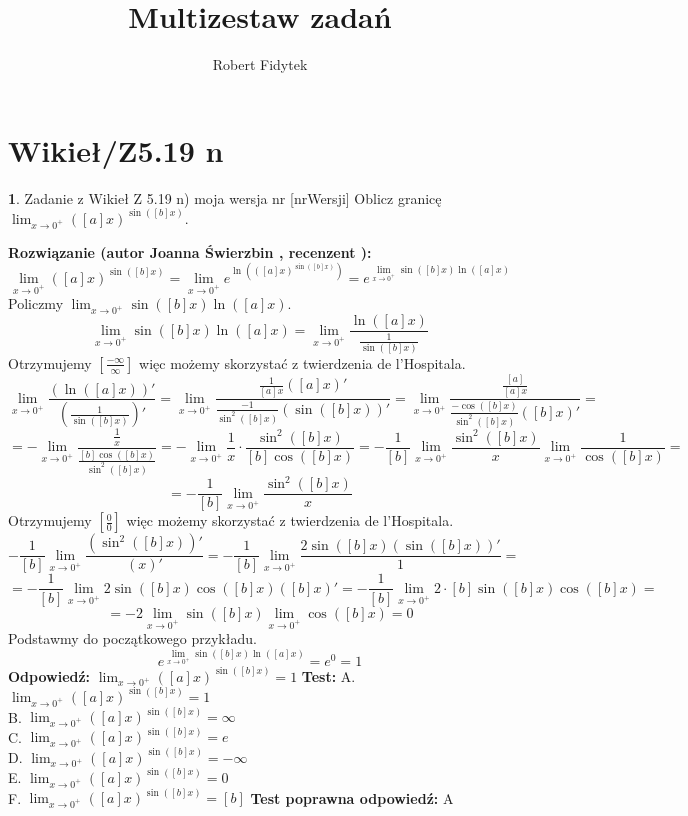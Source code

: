 \documentclass[12pt, a4paper]{article}
\title{Multizestaw zadań}
\author{Robert Fidytek}
\date{}
\theoremstyle{definition} %
\newtheorem{zad}{}
\newcommand{\kategoria}[1]{\section{#1}} %
\newcommand{\zadStart}[1]{\begin{zad}#1\newline} %
\newcommand{\zadStop}{\end{zad}}   %
\newcommand{\rozwStart}[2]{\noindent \textbf{Rozwiązanie (autor #1 , recenzent #2): }\newline} %
\newcommand{\rozwStop}{\newline}                                            %
\newcommand{\odpStart}{\noindent \textbf{Odpowiedź:}\newline}    %
\newcommand{\odpStop}{\newline}                                             %
\newcommand{\testStart}{\noindent \textbf{Test:}\newline} %
\newcommand{\testStop}{\newline} %
\newcommand{\kluczStart}{\noindent \textbf{Test poprawna odpowiedź:}\newline} %
\newcommand{\kluczStop}{\newline} %
\begin{document}
\maketitle


\kategoria{Wikieł/Z5.19 n}
\zadStart{Zadanie z Wikieł Z 5.19 n) moja wersja nr [nrWersji]}
Oblicz granicę $\lim_{x \rightarrow 0^{+}} \left( [a]x\right)^{\sin([b]x)}$.
\zadStop
\rozwStart{Joanna Świerzbin}{}
$$\lim_{x \rightarrow 0^{+}} \left( [a]x\right)^{\sin([b]x)}= \lim_{x \rightarrow 0^{+}} e^{\ln \left(\left( [a]x\right)^{\sin([b]x)} \right)}=
e^{\lim_{x \rightarrow 0^{+}}  {\sin([b]x)} \ln \left( [a]x\right)}$$
Policzmy ${\lim_{x \rightarrow 0^{+}}  {\sin([b]x)} \ln \left( [a]x\right)}$.
$${\lim_{x \rightarrow 0^{+}}  {\sin([b]x)} \ln \left( [a]x\right)} = \lim_{x \rightarrow 0^{+}} \frac{\ln \left( [a]x\right)}{\frac{1}{\sin([b]x)}}$$
Otrzymujemy $ \left[ \frac{-\infty}{\infty} \right] $ więc możemy skorzystać z twierdzenia de l'Hospitala.
$$\lim_{x \rightarrow 0^{+}} \frac{\left( \ln \left( [a]x\right) \right)'}{\left(\frac{1}{\sin([b]x)}\right)'} =
\lim_{x \rightarrow 0^{+}} \frac{\frac{1}{[a]x}([a]x)'}{\frac{-1}{\sin^2([b]x)}\left( \sin([b]x) \right)'} =
\lim_{x \rightarrow 0^{+}} \frac{\frac{[a]}{[a]x}}{\frac{-\cos([b]x)}{\sin^2([b]x)}\left( [b]x \right)'} =$$
$$=-\lim_{x \rightarrow 0^{+}} \frac{\frac{1}{x}}{\frac{[b]\cos([b]x)}{\sin^2([b]x)}} =
-\lim_{x \rightarrow 0^{+}} \frac{1}{x} \cdot \frac{\sin^2([b]x)}{[b]\cos([b]x)} =
-\frac{1}{[b]} \lim_{x \rightarrow 0^{+}} \frac{\sin^2([b]x)}{x} \lim_{x \rightarrow 0^{+}} \frac{1}{\cos([b]x)} =$$
$$ = -\frac{1}{[b]} \lim_{x \rightarrow 0^{+}} \frac{\sin^2([b]x)}{x}  $$
Otrzymujemy $ \left[ \frac{0}{0} \right] $ więc możemy skorzystać z twierdzenia de l'Hospitala.
$$ -\frac{1}{[b]} \lim_{x \rightarrow 0^{+}} \frac{\left(\sin^2([b]x)\right)'}{\left(x\right)'}=
-\frac{1}{[b]} \lim_{x \rightarrow 0^{+}} \frac{2\sin([b]x)\left( \sin([b]x) \right)'}{1}=$$
$$=-\frac{1}{[b]} \lim_{x \rightarrow 0^{+}} {2\sin([b]x) \cos([b]x)([b]x)'}= -\frac{1}{[b]} \lim_{x \rightarrow 0^{+}} {2\cdot [b]\sin([b]x) \cos([b]x)}=$$
$$= -2 \lim_{x \rightarrow 0^{+}} {\sin([b]x) \lim_{x \rightarrow 0^{+}} \cos([b]x)}= 0$$
Podstawmy do początkowego przykładu.
$$e^{\lim_{x \rightarrow 0^{+}}  {\sin([b]x)} \ln \left( [a]x\right)} = e^{0} =1 $$
\rozwStop
\odpStart
$\lim_{x \rightarrow 0^{+}} \left( [a]x\right)^{\sin([b]x)} = 1$
\odpStop
\testStart
A. $\lim_{x \rightarrow 0^{+}} \left( [a]x\right)^{\sin([b]x)} = 1$\\
B. $\lim_{x \rightarrow 0^{+}} \left( [a]x\right)^{\sin([b]x)} = \infty$\\
C. $\lim_{x \rightarrow 0^{+}} \left( [a]x\right)^{\sin([b]x)} = e$\\
D. $\lim_{x \rightarrow 0^{+}} \left( [a]x\right)^{\sin([b]x)} = -\infty$\\
E. $\lim_{x \rightarrow 0^{+}} \left( [a]x\right)^{\sin([b]x)} = 0$\\
F. $\lim_{x \rightarrow 0^{+}} \left( [a]x\right)^{\sin([b]x)} = [b]$
\testStop
\kluczStart
A
\kluczStop
\end{document}
